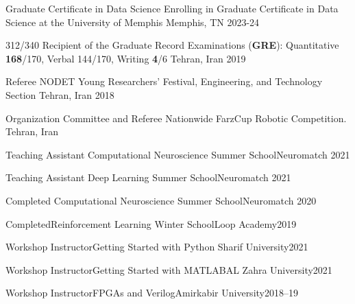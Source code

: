 \begin{cvhonors}
  
  \cvhonor
    {Graduate Certificate in Data Science} %
    {Enrolling in Graduate Certificate in Data Science at the University of Memphis}
    {Memphis, TN} %
    {2023-24} %

  \cvhonor
    {312/340} %
    {Recipient of the Graduate Record Examinations (\textbf{GRE}): Quantitative \textbf{168}/170, Verbal 144/170, Writing \textbf{4}/6} %
    {Tehran, Iran} %
    {2019} %
    
     \cvhonor
  {Referee}
  {NODET Young Researchers’ Festival, Engineering, and Technology Section}
  {Tehran, Iran}
	{2018}
 
  \cvhonor
    {Organization Committee and Referee}
    {Nationwide FarzCup Robotic Competition.}
    {Tehran, Iran}

    \cvhonor
    {Teaching Assistant}
    {Computational Neuroscience Summer School}{Neuromatch}
    {2021}

    \cvhonor
    {Teaching Assistant}
    {Deep Learning Summer School}{Neuromatch}
    {2021}

\cvhonor
{Completed}
{Computational Neuroscience Summer School}{Neuromatch}
{2020}

\cvhonor
{Completed}{Reinforcement Learning Winter School}{Loop Academy}{2019}

\cvhonor
{Workshop Instructor}{Getting Started with Python}{ Sharif University}{2021}

\cvhonor
{Workshop Instructor}{Getting Started with MATLAB}{AL Zahra University}{2021}

\cvhonor
{Workshop Instructor}{FPGAs and Verilog}{Amirkabir University}{2018–19}
\end{cvhonors}
